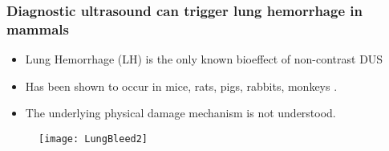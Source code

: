 \begin{frame}%
  \frametitle{\vspace*{0.5cm}Diagnostic ultrasound can trigger lung hemorrhage in mammals}
  {\small%
    \begin{itemize}%
    \item Lung Hemorrhage (LH) is the only known bioeffect of non-contrast DUS%
    \item Has been shown to occur in mice, rats, pigs, rabbits, monkeys \citep{Child1990,OBrien1997a,Tarantal1994a}.%
    \item The underlying physical damage mechanism is not understood.%
    \end{itemize}%
    \begin{figure}%
      \centering%
      \texttt{[image: LungBleed2]} \nocite{Miller2012}%
    \end{figure}%
  }
\end{frame}

